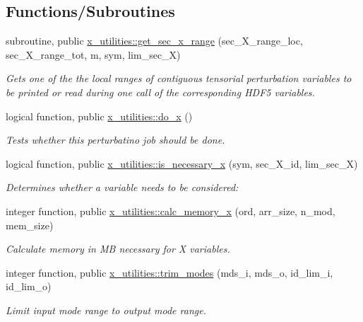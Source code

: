 \subsection*{Functions/\+Subroutines}
\begin{DoxyCompactItemize}
\item 
subroutine, public \hyperlink{namespacex__utilities_a6072ddd1fd230758795ff320c75a1f6a}{x\+\_\+utilities\+::get\+\_\+sec\+\_\+x\+\_\+range} (sec\+\_\+\+X\+\_\+range\+\_\+loc, sec\+\_\+\+X\+\_\+range\+\_\+tot, m, sym, lim\+\_\+sec\+\_\+X)
\begin{DoxyCompactList}\small\item\em Gets one of the the local ranges of contiguous tensorial perturbation variables to be printed or read during one call of the corresponding H\+D\+F5 variables. \end{DoxyCompactList}\item 
logical function, public \hyperlink{namespacex__utilities_adef8eab82f0fd670a7795c754cf9a8f9}{x\+\_\+utilities\+::do\+\_\+x} ()
\begin{DoxyCompactList}\small\item\em Tests whether this perturbatino job should be done. \end{DoxyCompactList}\item 
logical function, public \hyperlink{namespacex__utilities_a689aca7fedb49c43c5a65a18d557259f}{x\+\_\+utilities\+::is\+\_\+necessary\+\_\+x} (sym, sec\+\_\+\+X\+\_\+id, lim\+\_\+sec\+\_\+X)
\begin{DoxyCompactList}\small\item\em Determines whether a variable needs to be considered\+: \end{DoxyCompactList}\item 
integer function, public \hyperlink{namespacex__utilities_a4d18921da77463d069346f1c7322b451}{x\+\_\+utilities\+::calc\+\_\+memory\+\_\+x} (ord, arr\+\_\+size, n\+\_\+mod, mem\+\_\+size)
\begin{DoxyCompactList}\small\item\em Calculate memory in MB necessary for X variables. \end{DoxyCompactList}\item 
integer function, public \hyperlink{namespacex__utilities_afde797341c5056abecc7a9221dbd345e}{x\+\_\+utilities\+::trim\+\_\+modes} (mds\+\_\+i, mds\+\_\+o, id\+\_\+lim\+\_\+i, id\+\_\+lim\+\_\+o)
\begin{DoxyCompactList}\small\item\em Limit input mode range to output mode range. \end{DoxyCompactList}\end{DoxyCompactItemize}
